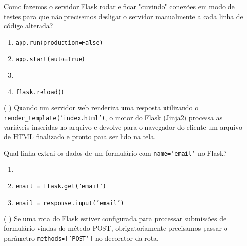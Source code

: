 \documentclass[12pt,a4paper]{article}
\newcommand{\correto}[1]{\iftoggle{gabarito}{\textbf{\color{corGabarito}#1}}{#1}}
\newcommand{\justificativa}[1]{\iftoggle{gabarito}{\vspace{0.2cm}\textbf{\color{corGabarito}Justificativa:} \color{corGabarito}#1}{\vspace{0.8cm}}}
\begin{document}
\begin{tcolorbox}[colback=white, colframe=azulTitulo, title=Questão 17]
    Como fazemos o servidor Flask rodar e ficar "ouvindo" conexões em modo de testes para que não precisemos desligar o servidor manualmente a cada linha de código alterada?
    \begin{enumerate}[label=\alph*)]
        \item \texttt{app.run(production=False)}
        \item \texttt{app.start(auto=True)}
        \item \correto{\texttt{app.run(debug=True)}}
        \item \texttt{flask.reload()}
    \end{enumerate}
\end{tcolorbox}

\begin{tcolorbox}[colback=white, colframe=azulTitulo, title=Questão 18 (V/F)]
    ( ) Quando um servidor web renderiza uma resposta utilizando o \texttt{render\_template('index.html')}, o motor do Flask (Jinja2) processa as variáveis inseridas no arquivo e devolve para o navegador do cliente um arquivo de HTML finalizado e pronto para ser lido na tela.
    \justificativa{Verdadeiro.}
\end{tcolorbox}

\begin{tcolorbox}[colback=white, colframe=azulTitulo, title=Questão 19]
    Qual linha extrai os dados de um formulário com \texttt{name='email'} no Flask?
    \begin{enumerate}[label=\alph*)]
        \item \correto{\texttt{email = request.form['email']}}
        \item \texttt{email = flask.get('email')}
        \item \texttt{email = response.input('email')}
    \end{enumerate}
\end{tcolorbox}

\begin{tcolorbox}[colback=white, colframe=azulTitulo, title=Questão 20 (V/F)]
    ( ) Se uma rota do Flask estiver configurada para processar submissões de formulário vindas do método POST, obrigatoriamente precisamos passar o parâmetro \texttt{methods=['POST']} no decorator da rota.
    \justificativa{Verdadeiro. Se os métodos permitidos não forem declarados, a rota aceita apenas GET por padrão.}
\end{tcolorbox}
\end{document}
